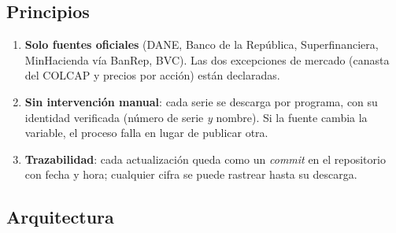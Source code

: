 \documentclass[11pt]{article}
\begin{document}
\subsection{Principios}
\begin{enumerate}
\item \textbf{Solo fuentes oficiales} (DANE, Banco de la República, Superfinanciera, MinHacienda vía BanRep, BVC).
Las dos excepciones de mercado (canasta del COLCAP y precios por acción) están declaradas.
\item \textbf{Sin intervención manual}: cada serie se descarga por programa, con su identidad verificada
(número de serie \emph{y} nombre). Si la fuente cambia la variable, el proceso falla en lugar de publicar otra.
\item \textbf{Trazabilidad}: cada actualización queda como un \emph{commit} en el repositorio con fecha y hora;
cualquier cifra se puede rastrear hasta su descarga.
\end{enumerate}

\subsection{Arquitectura}
\begin{center}
\end{center}
\end{document}
